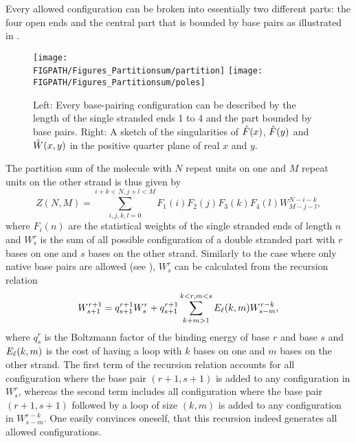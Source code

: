 Every allowed configuration can be broken into essentially two different parts: the four open ends
and the central part that is bounded by base pairs as illustrated in . 
\begin{figure}
\centering
\texttt{[image: \\FIGPATH/Figures\_Partitionsum/partition]}
\texttt{[image: \\FIGPATH/Figures\_Partitionsum/poles]}
\caption[Calculating the partition sum.]{\label{fig:partition}Left: Every base-pairing configuration can be described by the length of the single stranded ends 1 to 4 and the part bounded by base pairs.
Right: A sketch of the singularities of $\hat{F}(x)$, $\hat{F}(y)$ and $\hat{W}(x,y)$ in the positive quarter plane
of real $x$ and $y$. }
\end{figure}
The partition sum of the molecule with $N$ 
repeat units on one and $M$ repeat units on the other strand is thus given by
\begin{equation}
\label{eq:completeZ}
  Z(N,M)=\sum_{i,j,k,l=0}^{i+k< N, j+l< M}F_1(i)F_2(j)F_3(k)F_4(l)W_{M-j-l}^{N-i-k},
\end{equation}
where $F_i(n)$ are the statistical weights of the single stranded ends of length $n$ and $W_s^{r}$ is the sum of all possible configuration of a double stranded part with $r$ bases on one and $s$ bases on the other strand.
Similarly to the case where only native base pairs are allowed (see ), $W_s^{r}$ can 
be calculated from the recursion relation
\begin{equation}
\label{eq:recursion}
  W_{s+1}^{r+1}=q_{s+1}^{r+1}W_{s}^r+q_{s+1}^{r+1}\sum_{k+m>1}^{k<r,m<s} {E_{\ell}}(k,m)W_{s-m}^{r-k},
\end{equation}
where $q_{s}^{r}$ is the Boltzmann factor of the binding energy of base $r$ and base $s$ and ${E_{\ell}}(k,m)$ is the cost 
of having a loop with $k$ bases on one and $m$ bases on the other strand. The first term of the
recursion relation accounts for all configuration where the base pair $(r+1,s+1)$ is added to 
any configuration in $W_{s}^r$, whereas the second term includes all configuration where the
base pair $(r+1,s+1)$ followed by a loop of size $(k,m)$ is added to any configuration in $W_{s-m}^{r-k}$.
One easily convinces oneself, that this recursion indeed generates all allowed configurations.

